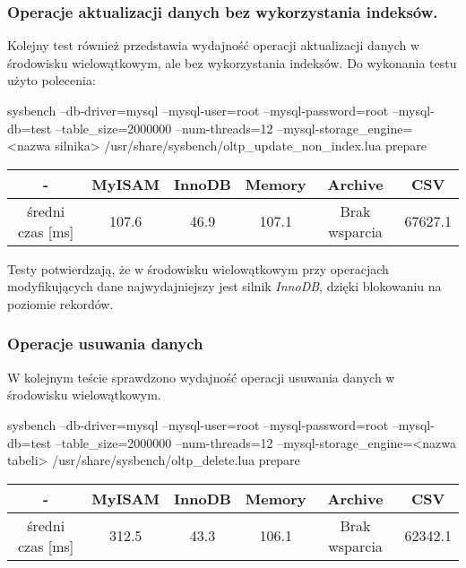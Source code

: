 \subsubsection{Operacje aktualizacji danych bez wykorzystania indeksów.}
Kolejny test również przedstawia wydajność operacji aktualizacji danych w środowisku wielowątkowym, ale bez wykorzystania indeksów.
Do wykonania testu użyto polecenia:
\begin{spverbatim}
	sysbench --db-driver=mysql --mysql-user=root --mysql-password=root
	--mysql-db=test --table_size=2000000 --num-threads=12 
	--mysql-storage_engine=	<nazwa silnika>
	/usr/share/sysbench/oltp_update_non_index.lua prepare
	
\end{spverbatim}
\begin{center}
	\begin{tabular}{ | c | c | c | c | c | c |}
		\hline
		- & MyISAM & InnoDB & Memory & Archive & CSV  \\ 
		\hline
		średni czas [ms] & 107.6 & 46.9 & 107.1 & Brak wsparcia & 67627.1 \\
		\hline
	\end{tabular}
\end{center}

Testy potwierdzają, że w środowisku wielowątkowym przy operacjach modyfikujących dane najwydajniejszy jest silnik \textit{InnoDB}, dzięki blokowaniu na poziomie rekordów.
\subsubsection{Operacje usuwania danych}
W kolejnym teście sprawdzono wydajność operacji usuwania danych w środowisku wielowątkowym.
\begin{spverbatim}
	sysbench --db-driver=mysql --mysql-user=root --mysql-password=root 
	--mysql-db=test --table_size=2000000 --num-threads=12 
	--mysql-storage_engine=<nazwa tabeli>  
	/usr/share/sysbench/oltp_delete.lua prepare
\end{spverbatim}

\begin{center}
\begin{tabular}{ | c | c | c | c | c | c |}
	\hline
	- & MyISAM & InnoDB & Memory & Archive & CSV  \\ 
	\hline
	średni czas [ms] & 312.5 & 43.3 & 106.1 & Brak wsparcia & 62342.1 \\
	\hline
\end{tabular}
\end{center}


